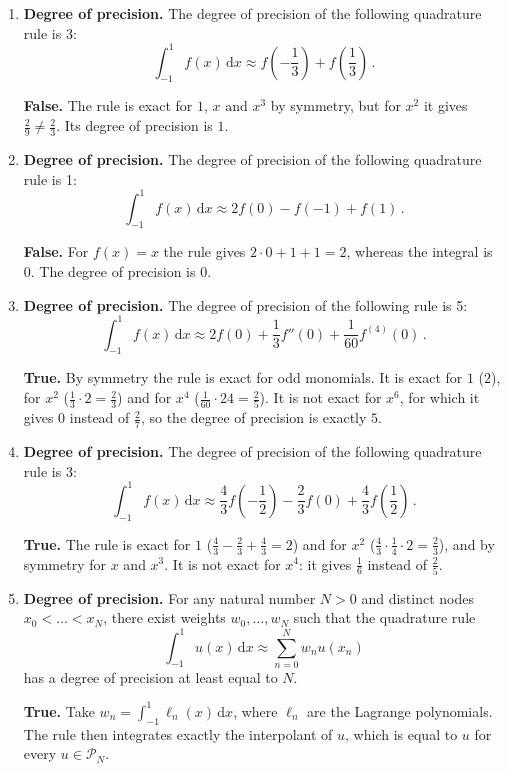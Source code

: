 \documentclass[a4paper]{article}
\renewcommand{\d}{\mathrm d}
\newcommand{\answer}[1]{%
    \ifdefined\showsolutions
        \par\smallskip
        {\small\color{blue!60!black}#1\par}
    \fi
}
\begin{document}
\begin{enumerate}

    \item
        \textbf{Degree of precision.}
        The degree of precision of the following quadrature rule is 3:
        \begin{equation}
            \label{eq:two_point_rule}
            \int_{-1}^{1} f(x) \, \d x \approx f\left(-\frac{1}{3}\right) + f\left(\frac{1}{3}\right)\,.
        \end{equation}
        \answer{\textbf{False.}
        The rule is exact for $1$, $x$ and $x^3$ by symmetry, but for $x^2$ it gives $\frac{2}{9} \neq \frac{2}{3}$.
        Its degree of precision is $1$.}

    \item
        \textbf{Degree of precision.}
        The degree of precision of the following quadrature rule is 1:
        \[
            \int_{-1}^{1} f(x) \, \d x \approx 2 f(0) - f(-1) + f(1)\,.
        \]
        \answer{\textbf{False.}
        For $f(x) = x$ the rule gives $2 \cdot 0 + 1 + 1 = 2$, whereas the integral is $0$.
        The degree of precision is $0$.}

    \item
        \textbf{Degree of precision.}
        The degree of precision of the following rule is 5:
        \[
            \int_{-1}^1 f(x) \, \d x \approx 2f(0) + \frac{1}{3} f''(0) + \frac{1}{60} f^{(4)}(0)\,.
        \]
        \answer{\textbf{True.}
        By symmetry the rule is exact for odd monomials.
        It is exact for $1$ ($2$), for $x^2$ ($\frac{1}{3} \cdot 2 = \frac{2}{3}$) and for $x^4$ ($\frac{1}{60} \cdot 24 = \frac{2}{5}$).
        It is not exact for $x^6$, for which it gives $0$ instead of $\frac{2}{7}$, so the degree of precision is exactly $5$.}

    \item
        \textbf{Degree of precision.}
        The degree of precision of the following quadrature rule is 3:
        \[
            \int_{-1}^{1} f(x) \, \d x \approx \frac{4}{3} f\left(-\frac{1}{2}\right) - \frac{2}{3} f(0) + \frac{4}{3} f\left(\frac{1}{2}\right)\,.
        \]
        \answer{\textbf{True.}
        The rule is exact for $1$ ($\frac{4}{3} - \frac{2}{3} + \frac{4}{3} = 2$) and for $x^2$ ($\frac{4}{3} \cdot \frac{1}{4} \cdot 2 = \frac{2}{3}$),
        and by symmetry for $x$ and $x^3$.
        It is not exact for $x^4$: it gives $\frac{1}{6}$ instead of $\frac{2}{5}$.}

    \item
        \textbf{Degree of precision.}
        For any natural number $N > 0$ and distinct nodes $x_0 < \dotsc < x_N$,
        there exist weights $w_0, \dotsc, w_N$ such that the quadrature rule
        \[
            \int_{-1}^{1} u(x) \, \d x \approx \sum_{n=0}^{N} w_n u(x_n)
        \]
        has a degree of precision at least equal to $N$.
        \answer{\textbf{True.}
        Take $w_n = \int_{-1}^1 \ell_n(x) \, \d x$, where $\ell_n$ are the Lagrange polynomials.
        The rule then integrates exactly the interpolant of $u$, which is equal to $u$ for every $u \in \mathcal P_N$.}


\end{enumerate}
\end{document}
